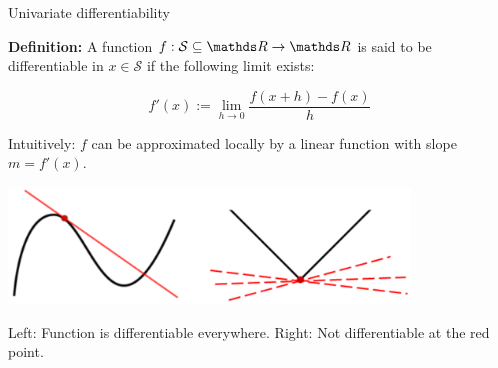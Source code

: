 \begin{vbframe}{Univariate differentiability}

\textbf{Definition:} A function $f: \mathcal{S} \subseteq \R \to \R$ is said to be differentiable in $x \in \mathcal{S}$ if the following limit exists:

$$
f'(x) := \lim_{h \to 0} \frac{f(x + h) - f(x)}{h}
$$

Intuitively: $f$ can be approximated locally by a linear function with slope $m = f'(x)$. 

\begin{center}
\includegraphics[width = 0.8\textwidth]{figure_man/tangent.png} \\
\begin{footnotesize}
Left: Function is differentiable everywhere. Right: Not differentiable at the red point. 
\end{footnotesize}
\end{center}








\end{vbframe}


